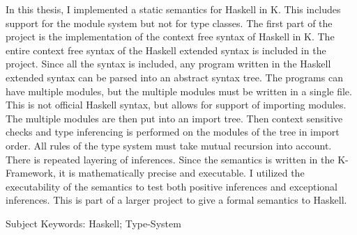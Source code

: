 In this thesis, I implemented a static semantics for Haskell in K. This includes support for the module system but not for type classes. The first part of the project is the implementation of the context free syntax of Haskell in K. The entire context free syntax of the Haskell extended syntax is included in the project. Since all the syntax is included, any program written in the Haskell extended syntax can be parsed into an abstract syntax tree. The programs can have multiple modules, but the multiple modules must be written in a single file. This is not official Haskell syntax, but allows for support of importing modules. The multiple modules are then put into an import tree. Then context sensitive checks and type inferencing is performed on the modules of the tree in import order. All rules of the type system must take mutual recursion into account. There is repeated layering of inferences. Since the semantics is written in the K-Framework, it is mathematically precise and executable. I utilized the executability of the semantics to test both positive inferences and exceptional inferences. This is part of a larger project to give a formal semantics to Haskell.

Subject Keywords: Haskell; Type-System
